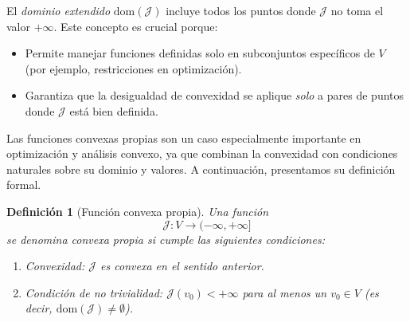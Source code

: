 \documentclass[12pt]{book}
\newtheorem{definition}{Definición}
\theoremstyle{definition}
\theoremstyle{plain}
\theoremstyle{remark}
\begin{document}
El \emph{dominio extendido} \( \text{dom}(\mathcal{J}) \) incluye todos los puntos donde \( \mathcal{J} \) no toma el valor \( +\infty \). Este concepto es crucial porque:
\begin{itemize}
    \item Permite manejar funciones definidas solo en subconjuntos específicos de \( V \) (por ejemplo, restricciones en optimización).
    \item Garantiza que la desigualdad de convexidad se aplique \emph{solo} a pares de puntos donde \( \mathcal{J} \) está bien definida.
\end{itemize}

Las funciones convexas propias son un caso especialmente importante en optimización y análisis convexo, ya que combinan la convexidad con condiciones naturales sobre su dominio y valores. A continuación, presentamos su definición formal. %

\begin{definition}[Función convexa propia]
Una función \[ \mathcal{J}: V \to (-\infty, +\infty] \] se denomina \emph{convexa propia} si cumple las siguientes condiciones:
\begin{enumerate}
    \item \emph{Convexidad:} \( \mathcal{J} \) es convexa en el sentido anterior. %
    \item \emph{Condición de no trivialidad:} \( \mathcal{J}(v_0) < +\infty \) para al menos un \( v_0 \in V \) (es decir, \( \text{dom}(\mathcal{J}) \neq \emptyset \)).
\end{enumerate}
\end{definition}


\end{document}
